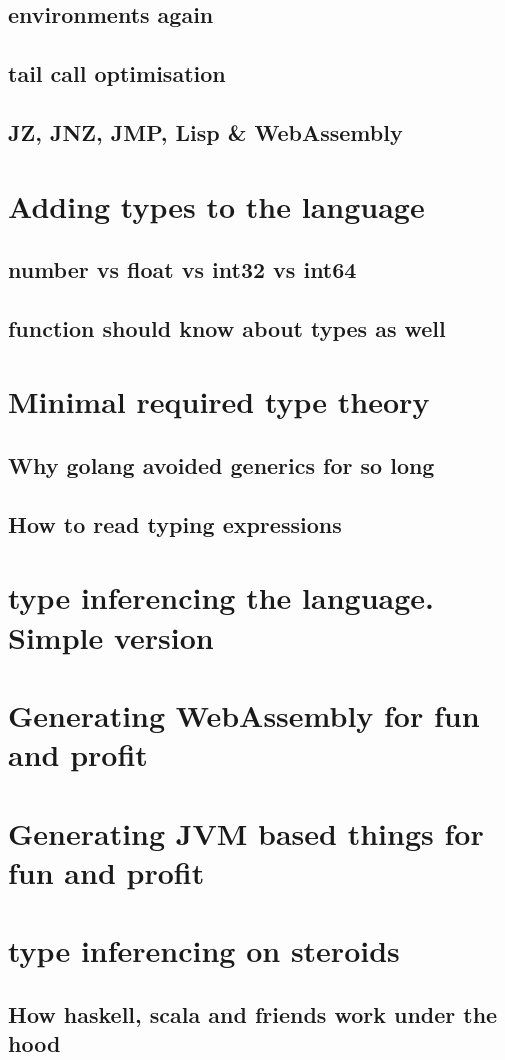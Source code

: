 \documentclass[11pt]{article}
\begin{document}
\subsection{environments again}
\label{sec:orgfab1cb3}
\subsection{tail call optimisation}
\label{sec:org99c9968}
\subsection{JZ, JNZ, JMP, Lisp \& WebAssembly}
\label{sec:org5baf303}
\section{Adding types to the language}
\label{sec:orgc82f10c}
\subsection{number vs float vs int32 vs int64}
\label{sec:orgf09a2b5}
\subsection{function should know about types as well}
\label{sec:org6dd318c}
\section{Minimal required type theory}
\label{sec:orgd690421}
\subsection{Why golang avoided generics for so long}
\label{sec:org4ccdc22}
\subsection{How to read typing expressions}
\label{sec:org0444029}
\section{type inferencing  the language. Simple version}
\label{sec:orgefbf440}
\section{Generating WebAssembly for fun and profit}
\label{sec:org1455f8f}
\section{Generating JVM based things for fun and profit}
\label{sec:org1bbc1fd}
\section{type inferencing on steroids}
\label{sec:org02f30c9}
\subsection{How haskell, scala and friends work under the hood}
\label{sec:orgde128cd}
\end{document}
